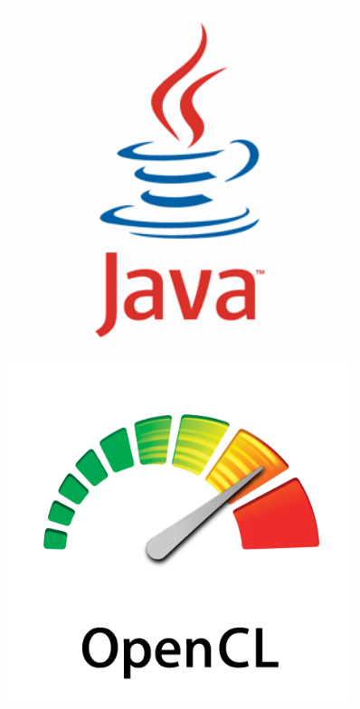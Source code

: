 \documentclass[aspectratio=169]{beamer}
\begin{document}
\begin{frame}
\begin{columns}[c]
\begin{figure}[h!]
    \centering	\includegraphics[width=0.9\textwidth]{./images/java.png} \\
    \centering	\includegraphics[width=0.9\textwidth]{./images/OpenCL.png} \\

\end{figure}
\end{columns}
\end{frame}
\end{document}
